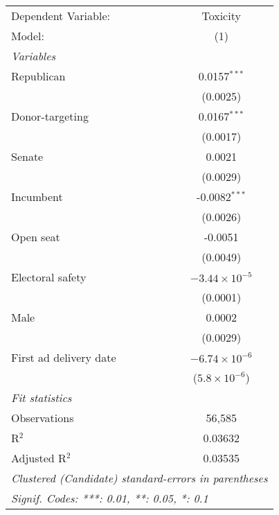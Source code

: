 
\begingroup
\centering
\begin{tabular}{lc}
   \tabularnewline \midrule \midrule
   Dependent Variable:    & Toxicity\\  
   Model:                 & (1)\\  
   \midrule
   \emph{Variables}\\
   Republican             & 0.0157$^{***}$\\   
                          & (0.0025)\\   
   Donor-targeting        & 0.0167$^{***}$\\   
                          & (0.0017)\\   
   Senate                 & 0.0021\\   
                          & (0.0029)\\   
   Incumbent              & -0.0082$^{***}$\\   
                          & (0.0026)\\   
   Open seat              & -0.0051\\   
                          & (0.0049)\\   
   Electoral safety       & $-3.44\times 10^{-5}$\\    
                          & (0.0001)\\   
   Male                   & 0.0002\\   
                          & (0.0029)\\   
   First ad delivery date & $-6.74\times 10^{-6}$\\    
                          & ($5.8\times 10^{-6}$)\\    
   \midrule
   \emph{Fit statistics}\\
   Observations           & 56,585\\  
   R$^2$                  & 0.03632\\  
   Adjusted R$^2$         & 0.03535\\  
   \midrule \midrule
   \multicolumn{2}{l}{\emph{Clustered (Candidate) standard-errors in parentheses}}\\
   \multicolumn{2}{l}{\emph{Signif. Codes: ***: 0.01, **: 0.05, *: 0.1}}\\
\end{tabular}
\par\endgroup


